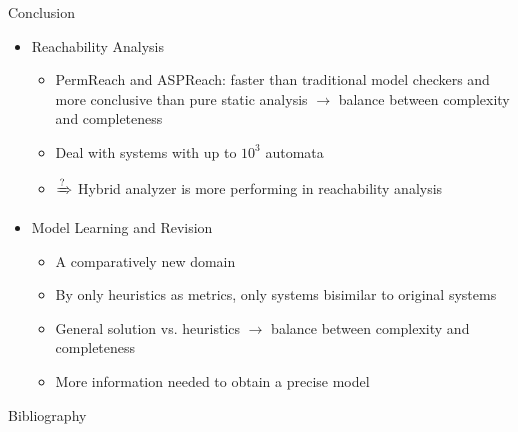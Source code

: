 \documentclass[8pt]{beamer}
\begin{document}
\begin{frame}{Conclusion}
\begin{itemize}
    \item Reachability Analysis
    \begin{itemize}
        \item PermReach and ASPReach: faster than traditional model checkers and more conclusive than pure static analysis $\to$ balance between complexity and completeness
        \item Deal with systems with up to $10^3$ automata
        \item $\xRightarrow{\text{?}}$ Hybrid analyzer is more performing in reachability analysis
    \end{itemize}
    \item Model Learning and Revision
    \begin{itemize}
        \item A comparatively new domain
        \item By only heuristics as metrics, only systems bisimilar to original systems
        \item General solution vs. heuristics $\to$ balance between complexity and completeness
        \item More information needed to obtain a precise model 
    \end{itemize}
\end{itemize}

\end{frame}

\begin{frame}{Bibliography}
    
    
\end{frame}
\end{document}
